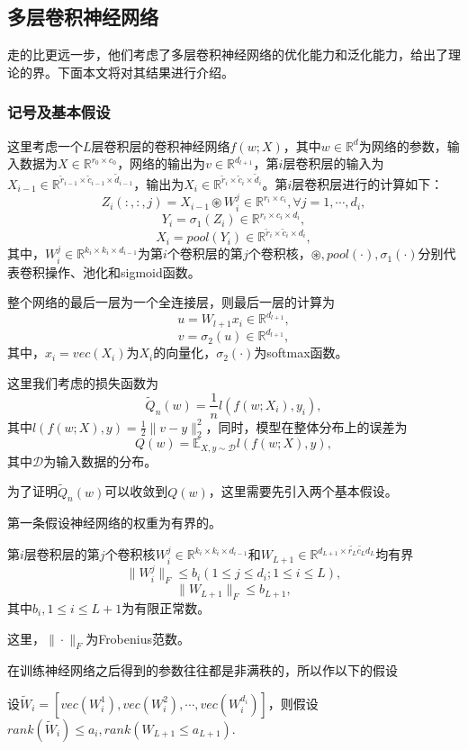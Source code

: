 \subsection{多层卷积神经网络}
\citet{zhou2018understanding}走的比\citet{du2018many}更远一步，他们考虑了多层卷积神经网络的优化能力和泛化能力，给出了理论的界。下面本文将对其结果进行介绍。
\subsubsection{记号及基本假设}
这里考虑一个$L$层卷积层的卷积神经网络$f(w;X)$，其中$w\in \mathbb{R}^d$为网络的参数，输入数据为$X\in \mathbb{R}^{r_0\times c_0}$，网络的输出为$v\in \mathbb{R}^{d_{l+1}}$，第$i$层卷积层的输入为$X_{i-1} \in \mathbb{R}^{\tilde{r}_{i-1}\times \tilde{c}_{i-1}\times \tilde{d}_{i-1}}$，输出为$X_{i} \in \mathbb{R}^{\tilde{r}_{i}\times \tilde{c}_{i}\times \tilde{d}_{i}}$。第$i$层卷积层进行的计算如下：
\[
 Z_i(:,:,j) = X_{i-1}\circledast W_i^j \in \mathbb{R}^{r_i\times c_i}, \forall j=1,\cdots,d_i,
\]
\[
Y_i = \sigma_1(Z_i)\in \mathbb{R}^{r_i\times c_i \times d_i},
\]
\[
 X_i = pool(Y_i) \in \mathbb{R}^{\tilde{r}_i\times \tilde{c}_i \times d_i},
\]
其中，$W_i^j \in \mathbb{R}^{k_i\times k_i \times d_{i-1}}$为第$i$个卷积层的第$j$个卷积核，$\circledast, pool(\cdot), \sigma_1(\cdot)$分别代表卷积操作、池化和sigmoid函数。
\par
整个网络的最后一层为一个全连接层，则最后一层的计算为
\[
u = W_{l+1}x_i \in \mathbb{R}^{d_{l+1}},
\]
\[
v = \sigma_2(u) \in \mathbb{R}^{d_{l+1}},
\]
其中，$x_i = vec(X_i)$为$X_i$的向量化，$\sigma_2(\cdot)$为softmax函数。
\par
这里我们考虑的损失函数为
\[
	\tilde{Q}_n(w) = \frac{1}{n} l(f(w;X_i), y_i),
\]
其中$l(f(w;X),y) = \frac{1}{2}\|v-y\|_2^2$，同时，模型在整体分布上的误差为
\[
	Q(w) = \mathbb{E}_{X,y \sim \mathcal{D}} l(f(w;X),y),
\]
其中$\mathcal{D}$为输入数据的分布。
\par
为了证明$\tilde{Q}_n(w)$可以收敛到$Q(w)$，这里需要先引入两个基本假设。
\par
第一条假设神经网络的权重为有界的。
\begin{assumption}
第$i$层卷积层的第$j$个卷积核$W_i^j\in\mathbb{R}^{k_i\times k_i \times d_{i-1}}$和$W_{L+1}\in \mathbb{R}^{d_{L+1}\times \tilde{r_L}\tilde{c_L}d_L}$均有界
\[
\|W_i^j\|_F \leq b_i (1\leq j\leq d_i; 1\leq i \leq L ),
\]
\[
\|W_{L+1}\|_F \leq b_{L+1},
\]
其中$b_i, 1\leq i \leq L+1$为有限正常数。
\end{assumption}
\par
这里，$\|\cdot\|_F$为Frobenius范数。
\par
在训练神经网络之后得到的参数往往都是非满秩的，所以作以下的假设
\begin{assumption}
设$\tilde{W}_i = [vec(W_i^1), vec(W_i^2),\cdots, vec(W_i^{d_i})]$，则假设$rank(\tilde{W}_i) \leq a_i, rank(W_{L+1}\leq a_{L+1})$.
\end{assumption}

